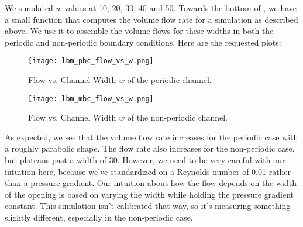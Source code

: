 We simulated $w$ values at 10, 20, 30, 40 and 50.
Towards the bottom of , we have a small function that computes
the volume flow rate for a simulation as described above.
We use it to assemble the volume flows for these widths in both the 
periodic and non-periodic boundary conditions.
Here are the requested plots:

\begin{figure}[H]
    \centering
    \texttt{[image: lbm\_pbc\_flow\_vs\_w.png]}
    \caption{Flow vs. Channel Width $w$ of the periodic channel.}
\end{figure}

\begin{figure}[H]
    \centering
    \texttt{[image: lbm\_mbc\_flow\_vs\_w.png]}
    \caption{Flow vs. Channel Width $w$ of the non-periodic channel.}
\end{figure}

As expected, we see that the volume flow rate increases for the periodic case with a roughly parabolic shape. The flow rate also increases for the non-periodic case, but plateaus past a width of 30. However, we need to be very careful with our intuition here, because we've standardized on a Reynolds number of 0.01 rather than a pressure gradient. Our intuition about how the flow depends on the width of the opening is based on varying the width while holding the pressure gradient constant. This simulation isn't calibrated that way, so it's measuring something slightly different, especially in the non-periodic case.